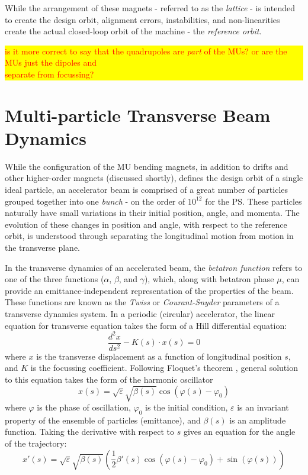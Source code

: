 \documentclass[11pt]{report}
\newcommand{\hly}[1]{\colorbox{yellow}{\parbox{\textwidth}{#1}}}
\begin{document}
While the arrangement of these magnets - referred to as the {\it lattice} - is intended to create the design orbit, alignment errors, instabilities, and non-linearities create the actual closed-loop orbit of the machine - the {\it reference orbit}.

\hly{\textcolor{red}{is it more correct to say that the quadrupoles are {\it part} of the MUs? or are the MUs just the dipoles and\\ separate from focussing?}}


\section{Multi-particle Transverse Beam Dynamics}


While the configuration of the MU bending magnets, in addition to drifts and other higher-order magnets (discussed shortly), defines the design orbit of a single ideal particle, an accelerator beam is comprised of a great number of particles grouped together into one {\it bunch} - on the order of $10^{12}$ for the PS. These particles naturally have small variations in their initial position, angle, and momenta. The evolution of these changes in position and angle, with respect to the reference orbit, is understood through separating the longitudinal motion from motion in the transverse plane.

In the transverse dynamics of an accelerated beam, the {\it betatron function} refers to one of the three functions ($\alpha$, $\beta$, and $\gamma$), which, along with betatron phase $\mu$, can provide an emittance-independent representation of the properties of the beam. These functions are known as the {\it Twiss} or {\it Courant-Snyder} parameters of a transverse dynamics system. In a periodic (circular) accelerator, the linear equation for transverse equation takes the form of a Hill differential equation:
\begin{equation}
\frac{d^2x}{ds^2}-K(s)\cdot x(s)=0
\end{equation} where $x$ is the transverse displacement as a function of longitudinal position $s$, and $K$ is the focussing coefficient. Following Floquet's theorem \cite{Rossbach:247501}, general solution to this equation takes the form of the harmonic oscillator 
\begin{equation}
x(s) =\sqrt{\varepsilon}\sqrt{\beta(s)}\cos(\varphi(s)-\varphi_0)
\end{equation} where $\varphi$ is the phase of oscillation, $\varphi_0$ is the initial condition, $\varepsilon$ is an invariant property of the ensemble of particles (emittance), and $\beta(s)$ is an amplitude function. Taking the derivative with respect to $s$ gives an equation for the angle of the trajectory:
\begin{equation}
x'(s)=\sqrt{\varepsilon}\sqrt{\beta(s)}\left(\frac12\beta'(s)\cos(\varphi(s)-\varphi_0)+\sin(\varphi(s))\right)
\end{equation}
\end{document}
